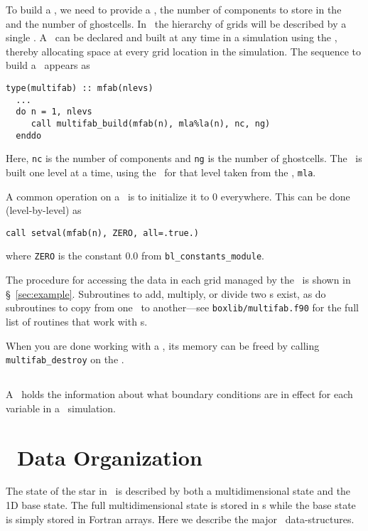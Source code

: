 To build a \multifab, we need to provide a \layout, the number of
components to store in the \multifab\, and the number of ghostcells.  In
\maestro\, the hierarchy of grids will be described by a single
\mllayout.  A \multifab\ can be declared and built at any time in a
simulation using the \mllayout, thereby allocating space at every
grid location in the simulation.  The sequence to build a \multifab\
appears as
\begin{lstlisting}[language={[95]fortran},mathescape=false]
  type(multifab) :: mfab(nlevs)
  ...
  do n = 1, nlevs
     call multifab_build(mfab(n), mla%la(n), nc, ng)
  enddo
\end{lstlisting}
Here, {\tt nc} is the number of components and {\tt ng} is the number
of ghostcells.  The \multifab\ is built one level at a time, using the
\layout\ for that level taken from the \mllayout, {\tt mla}.

A common operation on a \multifab\ is to initialize it to $0$
everywhere.  This can be done (level-by-level) as
\begin{lstlisting}[language={[95]fortran},mathescape=false]
call setval(mfab(n), ZERO, all=.true.)
\end{lstlisting}
where {\tt ZERO} is the constant 0.0 from {\tt bl\_constants\_module}.

The procedure for accessing the data in each grid managed by the \multifab\
is shown in \S~\ref{sec:example}.  
Subroutines to add, multiply, or divide two \multifab s exist, as do
subroutines to copy from one \multifab\ to another---see {\tt boxlib/multifab.f90}
for the full list of routines that work with \multifab s.


When you are done working with a \multifab, its memory can be freed by
calling {\tt multifab\_destroy} on the \multifab.




\subsection{\bctower}

A \bctower\ holds the information about what boundary conditions are
in effect for each variable in a \maestro\ simulation.  

\section{\maestro\ Data Organization}

The state of the star in \maestro\ is described by both a
multidimensional state and the 1D base state.  The full
multidimensional state is stored in \multifab s while the base state
is simply stored in Fortran arrays.  Here we describe the
major \maestro\ data-structures.




